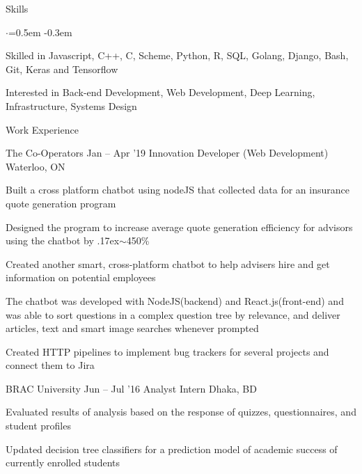 \documentclass{resume} %
\begin{document}

\begin{rSection}{Skills}
  \vspace {0.3em}
  \begin{list}{$\cdot$}{\leftmargin=0.5em}
    \itemsep -0.3em \vspace{-0.3em}
    \item Skilled in Javascript, C++, C, Scheme, Python, R, SQL, Golang, Django, Bash, Git, Keras and Tensorflow
    \item Interested in Back-end Development, Web Development, Deep Learning, Infrastructure, Systems Design
  \end{list}
  \vspace{0.3em}
\end{rSection}



\begin{rSection}{Work Experience}
  \begin{rSubsection}{The Co-Operators}
    {Jan -- Apr '19}
         {Innovation Developer (Web Development)}
         {Waterloo, ON}
       \item Built a cross platform chatbot using nodeJS that collected data for an insurance quote generation program
       \item Designed the program to increase average quote generation efficiency for advisors using the chatbot by {\raise.17ex\hbox{$\scriptstyle\mathtt{\sim}$}}450\%
    \item Created another smart, cross-platform chatbot to help advisers hire and get information on potential employees
    \item The chatbot was developed with NodeJS(backend) and React.js(front-end) and was able to sort questions in a complex question tree by relevance, and deliver articles, text and smart image searches whenever prompted
     \item Created HTTP pipelines to implement bug trackers for several projects and connect them to Jira
  \end{rSubsection}

	\begin{rSubsection}{BRAC University}
		{Jun -- Jul '16}
		{Analyst Intern}
		{Dhaka, BD}
		\item Evaluated results of analysis based on the response of quizzes, questionnaires, and student profiles
		\item Updated decision tree classifiers for a prediction model of academic success of currently enrolled students
	\end{rSubsection}

  
\end{rSection} 
\end{document}
